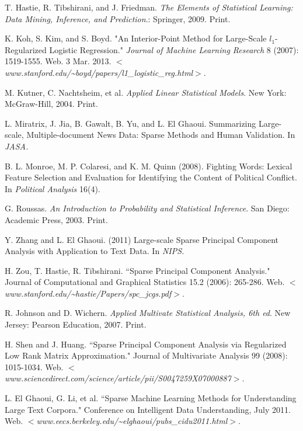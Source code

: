\documentclass{article}
\begin{document}
\begin{thebibliography}{99}
    T. Hastie, R. Tibshirani, and J. Friedman. \emph{The Elements of Statistical Learning: Data Mining, Inference, and Prediction}.: Springer, 2009. Print.

    K. Koh, S. Kim, and S. Boyd. "An Interior-Point Method for Large-Scale $l_1$-Regularized Logistic Regression." \emph{Journal of Machine Learning Research} 8 (2007): 1519-1555. Web. 3 Mar. 2013. \emph{$<$www.stanford.edu/\textasciitilde boyd/papers/l1\_logistic\_reg.html$>$}.

    M. Kutner, C. Nachtsheim, et al. \emph{Applied Linear Statistical Models}. New York: McGraw-Hill, 2004. Print.

 L. Miratrix, J. Jia, B. Gawalt, B. Yu, and L. El Ghaoui. Summarizing Large-scale, Multiple-document News Data: Sparse Methods and Human Validation. In \emph{JASA.}

B. L. Monroe, M. P. Colaresi, and K. M. Quinn (2008). Fighting Words: Lexical Feature Selection and Evaluation for Identifying the Content of Political Conflict. In \emph{Political Analysis} 16(4).

    G. Roussas. \emph{An Introduction to Probability and Statistical Inference}. San Diego: Academic Press, 2003. Print.

Y. Zhang and L. El Ghaoui. (2011) Large-scale Sparse Principal Component Analysis with
Application to Text Data. In \emph{NIPS.}

    H. Zou, T. Hastie, R. Tibshirani. ``Sparse Principal Component Analysis." Journal of Computational and Graphical Statistics 15.2 (2006): 265-286. Web. \emph{$<$www.stanford.edu/\textasciitilde hastie/Papers/spc\_jcgs.pdf$>$}.

    R. Johnson and D. Wichern. \emph{Applied Multivate Statistical Analysis, 6th ed}. New Jersey: Pearson Education, 2007. Print.

H. Shen and J. Huang. ``Sparse Principal Component Analysis via Regularized Low Rank Matrix Approximation." Journal of Multivariate Analysis 99 (2008): 1015-1034. Web. \emph{$<$www.sciencedirect.com/science/article/pii/S0047259X07000887$>$}.

L. El Ghaoui, G. Li, et al. ``Sparse Machine Learning Methods for Understanding Large Text Corpora." Conference on Intelligent Data Understanding, July 2011. Web. \emph{$<$www.eecs.berkeley.edu/\textasciitilde elghaoui/pubs\_cidu2011.html$>$}.


\end{thebibliography}
\end{document}
